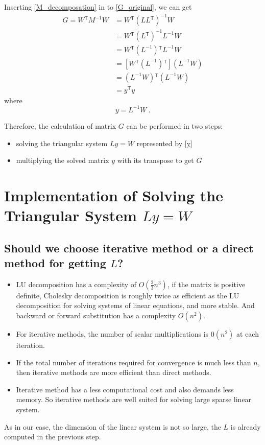 \documentclass[a4paper,fleqn,13pt]{article}
\newcommand\transpose{{}^\mathsf{T}}
\begin{document}
Inserting \ref{M_decomposation} in to \ref{G_original}, we can get
\begin{align} \label{G_simplify}
  G = {W}\transpose M^{-1} W &= {W}\transpose \left(L {L}\transpose \right)^{-1}W \\
                             &= {W}\transpose {\left( {L}\transpose\right)}^{-1} L^{-1} W \\
                             &= {W}\transpose  {\left(L^{-1}\right)}\transpose L^{-1} W \\
                             &= \left[{W}\transpose  {\left(L^{-1}\right)}\transpose \right] \left(L^{-1} W \right) \\
                             &= {\left(L^{-1} W \right)}\transpose \left(L^{-1} W \right) \\
                             &= {y}\transpose y 
\end{align}
where 
\begin{equation}
 y = L^{-1} W  \ . \label{y}
\end{equation}

Therefore, the calculation of matrix $G$ can be performed in two steps:
\begin{itemize}
 \item solving the triangular system $L y = W $ represented by \ref{y}
 \item multiplying the solved matrix $y$ with its transpose to get $G$
\end{itemize}

\section{Implementation of Solving the Triangular System $L y = W $}

\subsection{Should we choose iterative method or a direct method for getting $L$?}
\begin{itemize}
  \item LU decomposition has a complexity of $O(\frac{2}{3} n^3)$,  if the matrix is positive definite,  Cholesky decomposition  is roughly twice as efficient as the LU decomposition for solving systems of linear equations, and more stable.  And backward or forward substitution has a complexity $O(n^2)$.
  \item For iterative methods, the number of scalar multiplications is $0(n^2)$ at each iteration. 
  \item If the total number of iterations required for convergence is much less than $n$, then iterative methods are more efficient than direct methods. 
  \item Iterative method has a less computational cost and also demands less memory. So  iterative methods are well suited for solving large sparse linear system.
\end{itemize}
As in our case, the dimension of the linear system is not so large, the $L$ is already computed in the previous step. 
\end{document}
